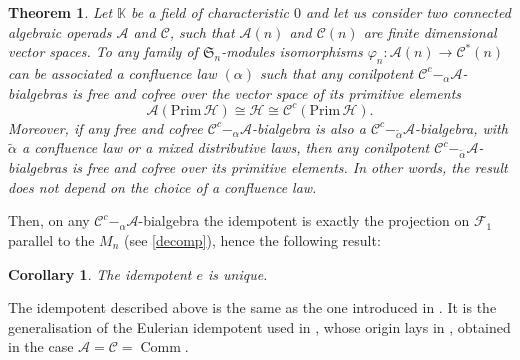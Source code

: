 \documentclass[11pt,leqno]{amsart}
\theoremstyle{definition}
\theoremstyle{plain}
\newtheorem{corollary}[definition]{Corollary}
\newtheorem{theorem}[definition]{Theorem}
\def\Prim{\mathrm{Prim\, }}
\newcommand{\A}{ \mathcal{A} }
\newcommand{\C}{ \mathcal{C} }
\newcommand{\F}{ \mathcal{F} }
\newcommand{\K}{ \mathbb{K} }
\newcommand{\comm}{ \operatorname{Comm} }
\begin{document}
\begin{theorem} \label{thmrig} Let $\K$ be a field of characteristic $0$ and let us consider two connected algebraic operads $\A$ and $\C$, such that $\A(n)$ and $\C(n)$ are finite dimensional vector spaces.
To any family of $\mathfrak{S}_n$-modules isomorphisms $\varphi_n: \A(n) \rightarrow \C^*(n) $ can be associated a confluence law $(\alpha)$ such that any conilpotent $\C^c-_{\alpha}\A$-bialgebras is free and cofree over the vector space of its primitive elements
\begin{equation*}
\A(\Prim \mathcal{H})\cong \mathcal{H} \cong \C^c(\Prim \mathcal{H}).
\end{equation*}
Moreover, if any free and cofree $\C^c-_{\alpha}\A$-bialgebra is also a $\C^c-_{\tilde{\alpha}}\A$-bialgebra, with $\tilde{\alpha}$ a confluence law or a mixed distributive laws, then any conilpotent $\C^c-_{\tilde{\alpha}}\A$-bialgebras is free and cofree over its primitive elements. In other words, the result does not depend on the choice of a confluence law.
\end{theorem}


Then, on any $\C^c-_\alpha \A$-bialgebra the idempotent is exactly the projection on $\F_1$ parallel to the $M_n$ (see \ref{decomp}), hence the following result:
\begin{corollary} \label{unique}
The idempotent $e$ is unique.
\end{corollary}

The idempotent described above is the same as the one introduced in \cite{GBO}. It is the generalisation of the Eulerian idempotent used in \cite{Patras}, whose origin lays in \cite{Chen}, obtained in the case $\A=\C=\comm$.
\end{document}
